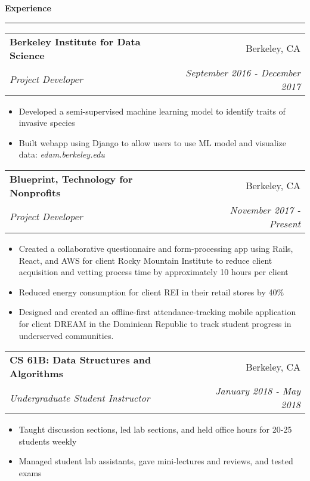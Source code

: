 \documentclass[11pt,letterpaper]{article}
\makeatletter
\newenvironment{topic}[1]
    {
    {\Large \centerline{#1}}
    \vspace*{0.03in}
    \hrule 
    \vspace*{0.05in}
    }
    {}
\newenvironment{event}
    {
    \begin{tabular*}{\textwidth}{l@{\extracolsep{\fill}}r}
    }
    {
    \end{tabular*}
    }
\makeatother
\begin{document}
\begin{topic}{\textbf{Experience}}
        \begin{event}
            \textbf{Berkeley Institute for Data Science} & Berkeley, CA \\
            \emph{Project Developer} & \emph{September 2016 - December 2017} \\
        \end{event}
            \begin{itemize}
                \item Developed a semi-supervised machine learning model to identify traits of invasive species
                \item Built webapp using Django to allow users to use ML model and visualize data: \emph{edam.berkeley.edu}
            \end{itemize}

        \begin{event}
            \textbf{Blueprint, Technology for Nonprofits} & Berkeley, CA \\
            \emph{Project Developer} & \emph{November 2017 - Present}
        \end{event}
            \begin{itemize}
                \item Created a collaborative questionnaire and form-processing app using Rails, React, and AWS for client Rocky Mountain Institute to reduce client acquisition and vetting process time by approximately 10 hours per client
                \item Reduced energy consumption for client REI in their retail stores by 40\% 
                \item Designed and created an offline-first attendance-tracking mobile application for client DREAM in the Dominican Republic to track student progress in underserved communities.
            \end{itemize}

        \begin{event}
            \textbf{CS 61B: Data Structures and Algorithms} & Berkeley, CA \\
            \emph{Undergraduate Student Instructor} & \emph{January 2018 - May 2018}
        \end{event}
            \begin{itemize}
                \item Taught discussion sections, led lab sections, and held office hours for 20-25 students weekly
                \item Managed student lab assistants, gave mini-lectures and reviews, and tested exams
            \end{itemize}
    \end{topic} 
\end{document}
